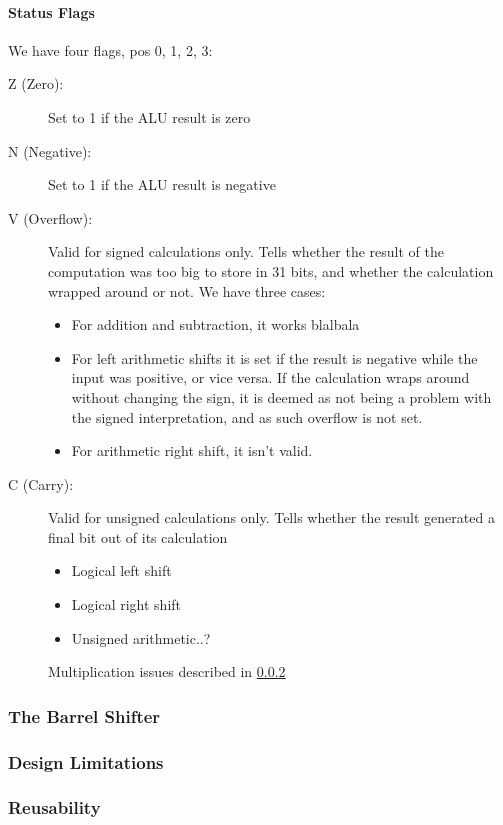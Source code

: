\documentclass{article}
\begin{document}
\paragraph{Status Flags}
\label{flags}
We have four flags, pos 0, 1, 2, 3:
\begin{description}
\item[Z (Zero):] Set to 1 if the ALU result is zero
\item[N (Negative):] Set to 1 if the ALU result is negative
\item[V (Overflow):] Valid for signed calculations only. Tells whether the result of the computation was too big to store in 31 bits, and whether the calculation wrapped around or not. We have three cases:
\begin{itemize}
\item For addition and subtraction, it works blalbala
\item For left arithmetic shifts it is set if the result is negative while the input was positive, or vice versa. If the calculation wraps around without changing the sign, it is deemed as not being a problem with the signed interpretation, and as such overflow is not set.
\item  For arithmetic right shift, it isn't valid.
\end{itemize}
\item[C (Carry):] Valid for unsigned calculations only. Tells whether the result generated a final bit out of its calculation
\begin{itemize}
\item Logical left shift
\item Logical right shift
\item Unsigned arithmetic..?
\end{itemize}

Multiplication issues described in \ref{subsec:limitations}
\end{description}



\subsubsection{The Barrel Shifter}
\label{subsubsec:barrelshifter}

\subsubsection{Design Limitations}
\label{subsec:limitations}

\subsubsection{Reusability}
\label{subsec:reusability}
\end{document}
